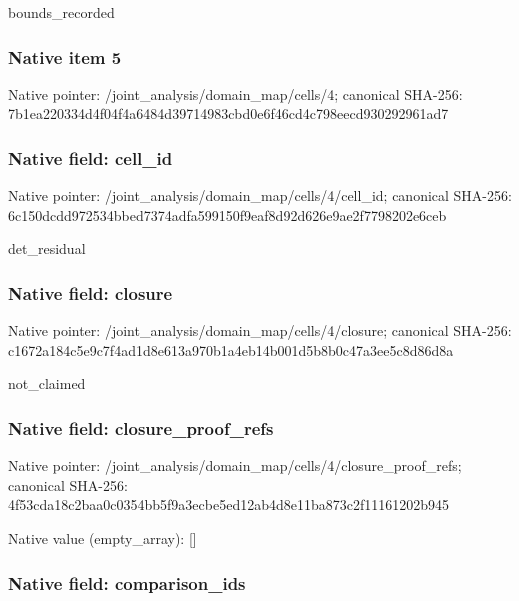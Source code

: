 \documentclass[10pt,a4paper]{article}
\begin{document}
bounds\_recorded


\subsubsection{Native item 5}


Native pointer: /joint\_analysis/domain\_map/cells/4; canonical SHA-256: 7b1ea220334d4f04f4a6484d\allowbreak{}39714983cbd0e6f46cd4c798\allowbreak{}eecd930292961ad7



\subsubsection{Native field: cell\_id}


Native pointer: /joint\_analysis/domain\_m\allowbreak{}ap/cells/4/cell\_id; canonical SHA-256: 6c150dcdd972534bbed7374a\allowbreak{}dfa599150f9eaf8d92d626e9\allowbreak{}ae2f7798202e6ceb


det\_residual


\subsubsection{Native field: closure}


Native pointer: /joint\_analysis/domain\_m\allowbreak{}ap/cells/4/closure; canonical SHA-256: c1672a184c5e9c7f4ad1d8e6\allowbreak{}13a970b1a4eb14b001d5b8b0\allowbreak{}c47a3ee5c8d86d8a


not\_claimed


\subsubsection{Native field: closure\_proof\_refs}


Native pointer: /joint\_analysis/domain\_m\allowbreak{}ap/cells/4/closure\_proof\allowbreak{}\_refs; canonical SHA-256: 4f53cda18c2baa0c0354bb5f\allowbreak{}9a3ecbe5ed12ab4d8e11ba87\allowbreak{}3c2f11161202b945



Native value (empty\_array): []



\subsubsection{Native field: comparison\_ids}
\end{document}

